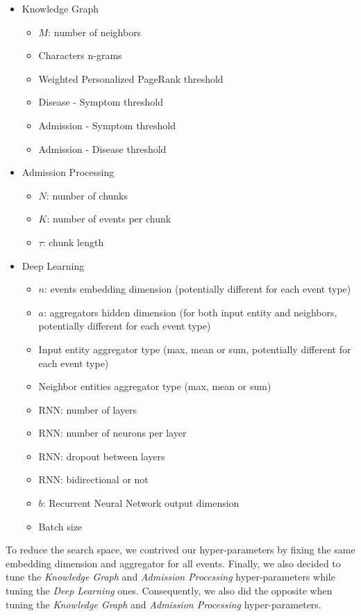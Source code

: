 \begin{itemize}
 \item Knowledge Graph
 \begin{itemize}
  \item $M$: number of neighbors
  \item Characters n-grams
  \item Weighted Personalized PageRank threshold
  \item Disease - Symptom threshold
  \item Admission - Symptom threshold
  \item Admission - Disease threshold
 \end{itemize}
 \item Admission Processing
 \begin{itemize}
  \item $N$: number of chunks
  \item $K$: number of events per chunk
  \item $\tau$: chunk length
 \end{itemize}
 \item Deep Learning
 \begin{itemize}
  \item $n$: events embedding dimension (potentially different for each event type)
  \item $a$: aggregators hidden dimension (for both input entity and neighbors, potentially different for each event type)
  \item Input entity aggregator type (max, mean or sum, potentially different for each event type)
  \item Neighbor entities aggregator type (max, mean or sum)
  \item RNN: number of layers
  \item RNN: number of neurons per layer
  \item RNN: dropout between layers
  \item RNN: bidirectional or not
  \item $b$: Recurrent Neural Network output dimension
  \item Batch size
 \end{itemize}
\end{itemize}

To reduce the search space, we contrived our hyper-parameters by fixing the same embedding dimension and aggregator for all events. Finally, we also decided to tune the \emph{Knowledge Graph} and \emph{Admission Processing} hyper-parameters while tuning the \emph{Deep Learning} ones. Consequently, we also did the opposite when tuning the \emph{Knowledge Graph} and \emph{Admission Processing} hyper-parameters. \\

